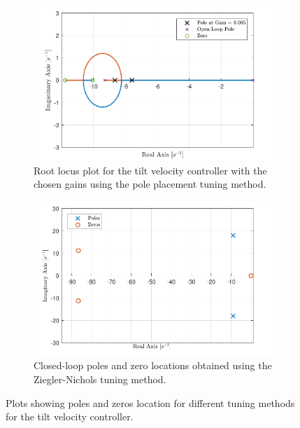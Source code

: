 \documentclass[../../main.tex]{subfiles}
\begin{document}
\begin{figure}[h]
\begin{subfigure}{0.49\textwidth}
    \includegraphics[width = 0.99\textwidth]{Sections/System_Design/Images/RL_TiltMotorVelPolePlace.pdf}
    \caption{Root locus plot for the tilt velocity controller with the chosen gains using the pole placement tuning method.}
    \label{fig:vel_root_locus}
\end{subfigure}\quad
\begin{subfigure}{0.49\textwidth}
    \includegraphics[width = 0.99\textwidth]{Sections/System_Design/Images/PoleZero_TiltMotorVel_NZ.pdf}
    \caption{Closed-loop poles and zero locations obtained using the Ziegler-Nichols tuning method.}
    \label{fig:ZN_pole_zero}
\end{subfigure}
\caption{Plots showing poles and zeros location for different tuning methods for the tilt velocity controller.}
\label{fig:vel_poles_zeros}
\end{figure}
\end{document}
